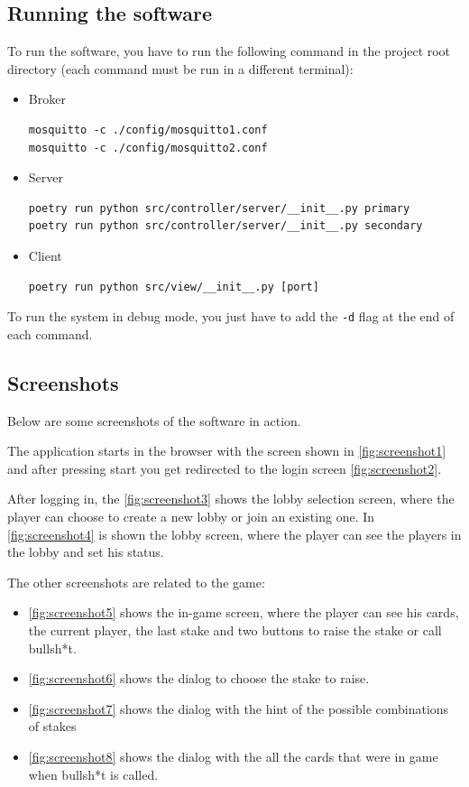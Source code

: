 \documentclass{scrartcl}
\begin{document}
\subsection{Running the software}\label{running-the-software}
To run the software, you have to run the following command in the project root directory 
(each command must be run in a different terminal):
\begin{itemize}
      \item Broker
            \begin{verbatim}
mosquitto -c ./config/mosquitto1.conf
mosquitto -c ./config/mosquitto2.conf
            \end{verbatim}
      \item Server
            \begin{verbatim}
poetry run python src/controller/server/__init__.py primary
poetry run python src/controller/server/__init__.py secondary
            \end{verbatim}
      \item Client
            \begin{verbatim}
poetry run python src/view/__init__.py [port]
            \end{verbatim}
\end{itemize}
To run the system in debug mode, you just have to add the \texttt{-d} flag at the end of each command.

\subsection{Screenshots}\label{screenshots}
Below are some screenshots of the software in action.

The application starts in the browser with the screen shown in \cref{fig:screenshot1}
and after pressing start you get redirected to the login screen \cref{fig:screenshot2}.

After logging in, the \cref{fig:screenshot3} shows the lobby selection screen, where the player can 
choose to create a new lobby or join an existing one. In \cref{fig:screenshot4} is shown the 
lobby screen, where the player can see the players in the lobby and set his status.

The other screenshots are related to the game:
\begin{itemize}
      \item \cref{fig:screenshot5} shows the in-game screen, where the player can see his cards, the 
            current player, the last stake and two buttons to raise the stake or call bullsh*t.
      \item \cref{fig:screenshot6} shows the dialog to choose the stake to raise.
      \item \cref{fig:screenshot7} shows the dialog with the hint of the possible combinations of 
            stakes
      \item \cref{fig:screenshot8} shows the dialog with the all the cards that were in game 
            when bullsh*t is called.
\end{itemize}
\end{document}
